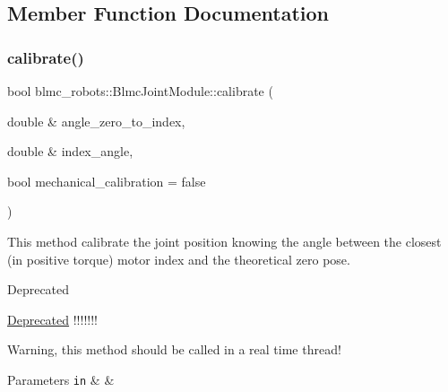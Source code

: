 \subsection{Member Function Documentation}
\mbox{\label{classblmc__robots_1_1BlmcJointModule_a17a1da041dae31e9a16f955722c36d6c}} 
\subsubsection{\texorpdfstring{calibrate()}{calibrate()}}
{\footnotesize\ttfamily bool blmc\+\_\+robots\+::\+Blmc\+Joint\+Module\+::calibrate (\begin{DoxyParamCaption}\item[{double \&}]{angle\+\_\+zero\+\_\+to\+\_\+index,  }\item[{double \&}]{index\+\_\+angle,  }\item[{bool}]{mechanical\+\_\+calibration = {\ttfamily false} }\end{DoxyParamCaption})}



This method calibrate the joint position knowing the angle between the closest (in positive torque) motor index and the theoretical zero pose. 

\begin{DoxyRefDesc}{Deprecated}
\item[\hyperlink{deprecated__deprecated000001}{Deprecated}]!!!!!!! \end{DoxyRefDesc}
Warning, this method should be called in a real time thread!


\begin{DoxyParams}[1]{Parameters}
\mbox{\tt in}  & {\em } & \\
\hline
\end{DoxyParams}
\mbox{\label{classblmc__robots_1_1BlmcJointModule_a3100c088a17264562c67429334e3dbf2}} 
